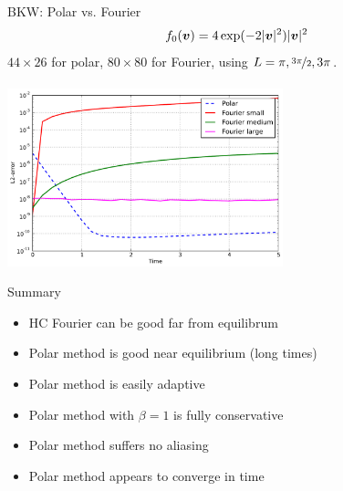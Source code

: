 \documentclass[hyperref={bookmarksopen, colorlinks, linkcolor=blue, urlcolor=green, citecolor=red}, color={usenames,dvipsnames}]{beamer}
\begin{document}
\begin{frame}{BKW: Polar vs. Fourier}
\[
    f_0({\bm v}) = 4 \exp(-2|{\bm v}|^2) |{\bm v}|^2
\]
$44\times26$ for polar, $80\times80$ for Fourier, using $L=\pi,\nicefrac{3\pi}{2},3\pi$. \\~\\

\centering
\includegraphics[width=8cm]{../figs/polboltz/compare-bkw}
\end{frame}

\begin{frame}{Summary}
\begin{itemize}[label=]
    \item HC Fourier can be good far from equilibrum
    \item Polar method is good near equilibrium (long times)
    \item Polar method is easily adaptive
    \item Polar method with $\beta=1$ is fully conservative
    \item Polar method suffers no aliasing
    \item Polar method appears to converge in time
\end{itemize}
\end{frame}

% 
%  

%
\end{document}
